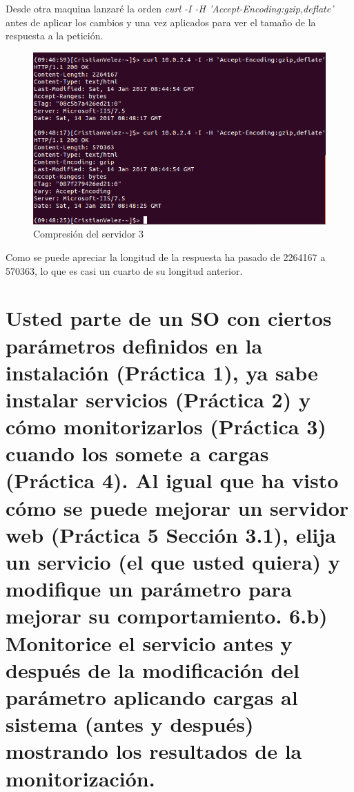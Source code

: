 Desde otra maquina lanzaré la orden \textit{curl -I -H 'Accept-Encoding:gzip,deflate'} antes de aplicar los cambios y una vez aplicados para ver el tamaño de la  respuesta a la petición.

\begin{figure}[H] %
	\centering
	\includegraphics[scale=0.5]{pics/4}  %
	\caption{Compresión del servidor 3} \label{fig:4}
\end{figure}

Como se puede apreciar la longitud de la respuesta ha pasado de 2264167 a 570363, lo que es casi un cuarto de su longitud anterior.



\section[Cuestión 6]{Usted parte de un SO con ciertos parámetros definidos en la	instalación (Práctica 1), ya sabe instalar servicios (Práctica 2) y cómo monitorizarlos (Práctica 3) cuando los somete a cargas (Práctica 4). Al igual que ha visto cómo se puede mejorar un servidor web (Práctica 5 Sección 3.1), elija un servicio (el que usted quiera) y modifique un parámetro para	mejorar su comportamiento. 6.b) Monitorice el servicio antes y después de la modificación del parámetro aplicando cargas al sistema (antes y después) mostrando los resultados de la monitorización.}

